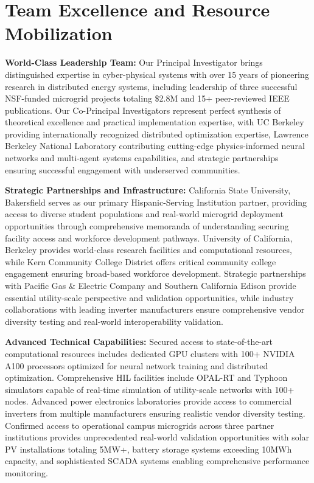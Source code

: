 \documentclass[12pt]{article}
\begin{document}
\section{Team Excellence and Resource Mobilization}

\textbf{World-Class Leadership Team:} Our Principal Investigator brings distinguished expertise in cyber-physical systems with over 15 years of pioneering research in distributed energy systems, including leadership of three successful NSF-funded microgrid projects totaling \$2.8M and 15+ peer-reviewed IEEE publications. Our Co-Principal Investigators represent perfect synthesis of theoretical excellence and practical implementation expertise, with UC Berkeley providing internationally recognized distributed optimization expertise, Lawrence Berkeley National Laboratory contributing cutting-edge physics-informed neural networks and multi-agent systems capabilities, and strategic partnerships ensuring successful engagement with underserved communities.

\textbf{Strategic Partnerships and Infrastructure:} California State University, Bakersfield serves as our primary Hispanic-Serving Institution partner, providing access to diverse student populations and real-world microgrid deployment opportunities through comprehensive memoranda of understanding securing facility access and workforce development pathways. University of California, Berkeley provides world-class research facilities and computational resources, while Kern Community College District offers critical community college engagement ensuring broad-based workforce development. Strategic partnerships with Pacific Gas \& Electric Company and Southern California Edison provide essential utility-scale perspective and validation opportunities, while industry collaborations with leading inverter manufacturers ensure comprehensive vendor diversity testing and real-world interoperability validation.

\textbf{Advanced Technical Capabilities:} Secured access to state-of-the-art computational resources includes dedicated GPU clusters with 100+ NVIDIA A100 processors optimized for neural network training and distributed optimization. Comprehensive HIL facilities include OPAL-RT and Typhoon simulators capable of real-time simulation of utility-scale networks with 100+ nodes. Advanced power electronics laboratories provide access to commercial inverters from multiple manufacturers ensuring realistic vendor diversity testing. Confirmed access to operational campus microgrids across three partner institutions provides unprecedented real-world validation opportunities with solar PV installations totaling 5MW+, battery storage systems exceeding 10MWh capacity, and sophisticated SCADA systems enabling comprehensive performance monitoring.
\end{document}
